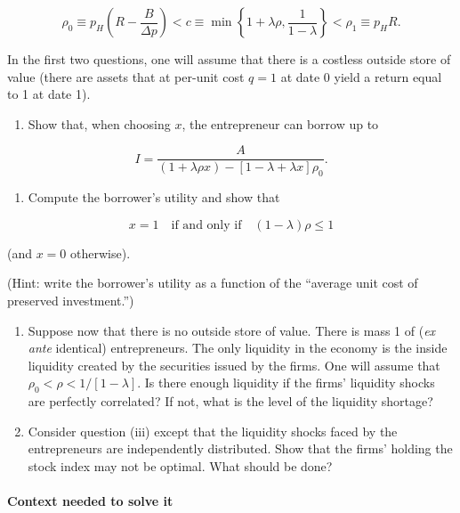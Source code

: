 \documentclass[11pt,a4paper]{article}
\providecommand{\tightlist}{\setlength{\itemsep}{0pt}\setlength{\parskip}{0pt}}
\begin{document}
\[\rho_0 \equiv p_H\left(R - \frac{B}{\Delta p}\right) < c \equiv \min\left\{1 + \lambda\rho, \frac{1}{1 - \lambda}\right\} < \rho_1 \equiv p_H R.\]

In the first two questions, one will assume that there is a costless outside store of value (there
are assets that at per-unit cost \(q = 1\) at date 0 yield a return equal to 1 at date 1).

\begin{enumerate}
\def\labelenumi{(\roman{enumi})}
\tightlist
\item
  Show that, when choosing \(x\), the entrepreneur can borrow up to
\end{enumerate}

\[I = \frac{A}{(1 + \lambda\rho x) - [1 - \lambda + \lambda x]\rho_0}.\]

\begin{enumerate}
\def\labelenumi{(\roman{enumi})}
\setcounter{enumi}{1}
\tightlist
\item
  Compute the borrower's utility and show that
\end{enumerate}

\[x = 1 \quad\text{if and only if}\quad (1 - \lambda)\rho \leqslant 1\]

(and \(x = 0\) otherwise).

(Hint: write the borrower's utility as a function of the ``average unit cost of preserved
investment.'')

\begin{enumerate}
\def\labelenumi{(\roman{enumi})}
\setcounter{enumi}{2}
\item
  Suppose now that there is no outside store of value. There is mass 1 of (\emph{ex ante} identical)
  entrepreneurs. The only liquidity in the economy is the inside liquidity created by the securities
  issued by the firms. One will assume that \(\rho_0 < \rho < 1/[1 - \lambda]\). Is there enough
  liquidity if the firms' liquidity shocks are perfectly correlated? If not, what is the level of
  the liquidity shortage?
\item
  Consider question (iii) except that the liquidity shocks faced by the entrepreneurs are
  independently distributed. Show that the firms' holding the stock index may not be optimal. What
  should be done?
\end{enumerate}

\paragraph{Context needed to solve it}
\end{document}
